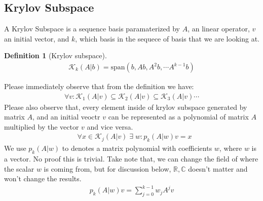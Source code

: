 \documentclass[]{article}
\theoremstyle{definition}
\newtheorem{definition}{Definition}
\begin{document}
    \subsection{Krylov Subspace}
        A Krylov Subspace is a sequence basis paramaterized by $A$, an linear operator, $v$ an initial vector, and $k$, which basis in the sequece of basis that we are looking at. 
        \begin{definition}[Krylov subspace]
            \begin{align}
                \mathcal{K}_k(A|b) = \text{span}( b, Ab, A^2b, \cdots A^{k - 1}b)
            \end{align}
        \end{definition}
        Please immediately observe that from the definition we have: 
        \begin{align}
            \forall v: \mathcal{K}_1(A|v)  \subseteq  \mathcal{K}_2(A|v)  \subseteq \mathcal{K}_3(A|v)  \cdots 
        \end{align}
        Please also observe that, every element inside of krylov subspace generated by matrix $A$, and an initial veoctr $v$ can be represented as a polynomial of matrix $A$ multiplied by the vector $v$ and vice versa.
        \begin{align}
            & \forall x \in \mathcal K_j(A|v) \;\exists\; w: p_k(A|w)v = x
        \end{align}
        We use $p_k(A|w)$ to denotes a matrix polynomial with coefficients $w$, where $w$ is a vector. No proof this is trivial. Take note that, we can change the field of where the scalar $w$ is coming from, but for discussion below, $\mathbb R, \mathbb C$  doesn't matter and won't change the results. 
        \begin{align}
            p_k(A|w)v = \sum_{j = 0}^{k - 1}w_jA^jv
        \end{align}
\end{document}
